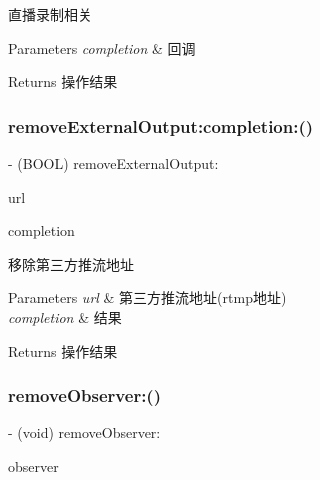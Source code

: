 直播录制相关 
\begin{DoxyParams}{Parameters}
{\em completion} & 回调 \\
\hline
\end{DoxyParams}
\begin{DoxyReturn}{Returns}
操作结果 
\end{DoxyReturn}
\mbox{\label{interface_c_c_streamer_basic_a1180df52bef6dacd8a85009cb4c84185}} 
\subsubsection{\texorpdfstring{remove\+External\+Output\+:completion\+:()}{removeExternalOutput:completion:()}}
{\footnotesize\ttfamily -\/ (B\+O\+OL) remove\+External\+Output\+: \begin{DoxyParamCaption}\item[{(N\+S\+String $\ast$)}]{url }\item[{completion:(C\+C\+Comletion\+Block)}]{completion }\end{DoxyParamCaption}}

移除第三方推流地址 
\begin{DoxyParams}{Parameters}
{\em url} & 第三方推流地址(rtmp地址) \\
\hline
{\em completion} & 结果 \\
\hline
\end{DoxyParams}
\begin{DoxyReturn}{Returns}
操作结果 
\end{DoxyReturn}
\mbox{\label{interface_c_c_streamer_basic_a3b6770a7d93808beee1672f04c9090cb}} 
\subsubsection{\texorpdfstring{remove\+Observer\+:()}{removeObserver:()}}
{\footnotesize\ttfamily -\/ (void) remove\+Observer\+: \begin{DoxyParamCaption}\item[{(id$<$ C\+C\+Streamer\+Basic\+Delegate $>$)}]{observer }\end{DoxyParamCaption}}

